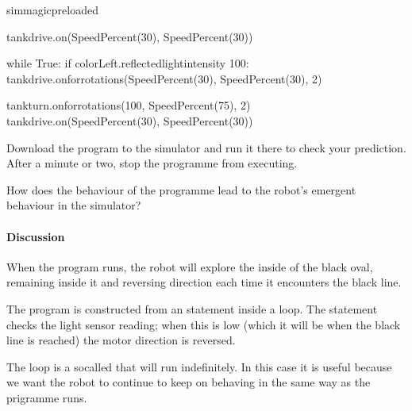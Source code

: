\documentclass[letterpaper,10pt,english]{sphinxmanual}
\begin{document}
{

{
\begin{sphinxVerbatim}[commandchars=\\\{\}]
\llap{\color{nbsphinxin}[ ]:\,\hspace{\fboxrule}\hspace{\fboxsep}}\PYGZpc{}\PYGZpc{}sim\PYGZus{}magic\PYGZus{}preloaded

tank\PYGZus{}drive.on(SpeedPercent(30), SpeedPercent(30))

while True:
    if colorLeft.reflected\PYGZus{}light\PYGZus{}intensity \PYGZlt{} 100:
        tank\PYGZus{}drive.on\PYGZus{}for\PYGZus{}rotations(SpeedPercent(\PYGZhy{}30),
                                    SpeedPercent(\PYGZhy{}30), 2)

        tank\PYGZus{}turn.on\PYGZus{}for\PYGZus{}rotations(\PYGZhy{}100, SpeedPercent(75), 2)
        tank\PYGZus{}drive.on(SpeedPercent(30), SpeedPercent(30))

\end{sphinxVerbatim}
}

Download the program to the simulator and run it there to check your prediction. After a minute or two, stop the programme from executing.

How does the behaviour of the programme lead to the robot’s emergent behaviour in the simulator?


\paragraph{Discussion}
\label{\detokenize{content/02_Robot_Lab/Section_00_02:Discussion}}

When the program runs, the robot will explore the inside of the black oval, remaining inside it and reversing direction each time it encounters the black line.

The program is constructed from an  statement inside a  loop. The  statement checks the light sensor reading; when this is low (which it will be when the black line is reached) the motor direction is reversed.

The  loop is a so\sphinxhyphen{}called  that will run indefinitely. In this case it is useful because we want the robot to continue to keep on behaving in the same way as the prigramme runs.

}
\end{document}
